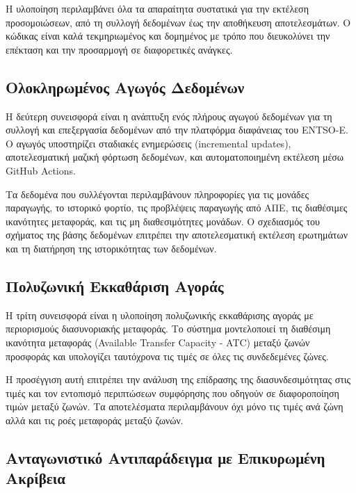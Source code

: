Η υλοποίηση περιλαμβάνει όλα τα απαραίτητα συστατικά για την εκτέλεση προσομοιώσεων, από τη συλλογή δεδομένων έως την αποθήκευση αποτελεσμάτων. Ο κώδικας είναι καλά τεκμηριωμένος και δομημένος με τρόπο που διευκολύνει την επέκταση και την προσαρμογή σε διαφορετικές ανάγκες.

\subsection{Ολοκληρωμένος Αγωγός Δεδομένων}
\label{subsec:data-pipeline-contribution}

Η δεύτερη συνεισφορά είναι η ανάπτυξη ενός πλήρους αγωγού δεδομένων για τη συλλογή και επεξεργασία δεδομένων από την πλατφόρμα διαφάνειας του ENTSO-E. Ο αγωγός υποστηρίζει σταδιακές ενημερώσεις (incremental updates), αποτελεσματική μαζική φόρτωση δεδομένων, και αυτοματοποιημένη εκτέλεση μέσω GitHub Actions.

Τα δεδομένα που συλλέγονται περιλαμβάνουν πληροφορίες για τις μονάδες παραγωγής, το ιστορικό φορτίο, τις προβλέψεις παραγωγής από ΑΠΕ, τις διαθέσιμες ικανότητες μεταφοράς, και τις μη διαθεσιμότητες μονάδων. Ο σχεδιασμός του σχήματος της βάσης δεδομένων επιτρέπει την αποτελεσματική εκτέλεση ερωτημάτων και τη διατήρηση της ιστορικότητας των δεδομένων.

\subsection{Πολυζωνική Εκκαθάριση Αγοράς}
\label{subsec:multizone-contribution}

Η τρίτη συνεισφορά είναι η υλοποίηση πολυζωνικής εκκαθάρισης αγοράς με περιορισμούς διασυνοριακής μεταφοράς. Το σύστημα μοντελοποιεί τη διαθέσιμη ικανότητα μεταφοράς (Available Transfer Capacity - ATC) μεταξύ ζωνών προσφοράς και υπολογίζει ταυτόχρονα τις τιμές σε όλες τις συνδεδεμένες ζώνες.

Η προσέγγιση αυτή επιτρέπει την ανάλυση της επίδρασης της διασυνδεσιμότητας στις τιμές και τον εντοπισμό περιπτώσεων συμφόρησης που οδηγούν σε διαφοροποίηση τιμών μεταξύ ζωνών. Τα αποτελέσματα περιλαμβάνουν όχι μόνο τις τιμές ανά ζώνη αλλά και τις ροές μεταφοράς μεταξύ ζωνών.

\subsection{Ανταγωνιστικό Αντιπαράδειγμα με Επικυρωμένη Ακρίβεια}
\label{subsec:counterfactual-contribution}

